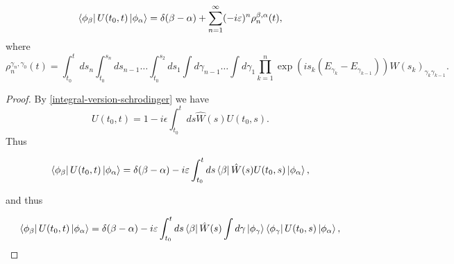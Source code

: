\documentclass[main.tex]{subfiles}
\begin{document}
\begin{lemma}
\label{perturbation-aproximations}
\begin{equation}
\bra{\phi_\beta} U(t_0, t) \ket{\phi_\alpha} = \delta(\beta - \alpha) + \sum_{n=1}^\infty (-i\varepsilon)^n \rho^{\beta,\alpha}_n(t),
\end{equation}
where
\begin{equation}
\rho^{\gamma_n, \gamma_0}_n(t) = \int_{t_0}^t ds_n \int_{t_0}^{s_n} ds_{n - 1}\dots \int_{t_0}^{s_2} ds_1 \int d\gamma_{n-1} \dots \int d\gamma_1
\prod_{k=1}^n \exp(is_k(E_{\gamma_k} - E_{\gamma_{k - 1}})) W(s_k)_{\gamma_k \gamma_{k - 1}}.
\end{equation}
\end{lemma}
\begin{proof}
By \ref{integral-version-schrodinger} we have
\begin{equation}
U(t_0, t) = 1 - i\epsilon \int_{t_0}^t ds \hat{W}(s) U(t_0, s).
\end{equation}
Thus

\begin{equation}
\bra{\phi_\beta} U(t_0, t) \ket{\phi_\alpha} = \delta(\beta - \alpha) - i\varepsilon\int_{t_0}^t ds \bra{\beta}\hat{W}(s) U(t_0, s)\ket{\phi_\alpha},
\end{equation}

and thus

\begin{equation}
\bra{\phi_\beta} U(t_0, t) \ket{\phi_\alpha} = \delta(\beta - \alpha) - i\varepsilon\int_{t_0}^t ds \bra{\beta}\hat{W}(s)\int d\gamma \ket{\phi_\gamma}\bra{\phi_\gamma} U(t_0, s)\ket{\phi_\alpha},
\end{equation}


\end{proof}
\end{document}
